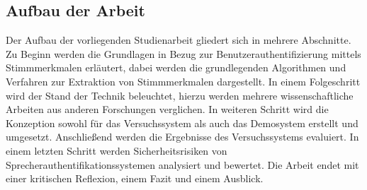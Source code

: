 \subsection{Aufbau der Arbeit}
Der Aufbau der vorliegenden Studienarbeit gliedert sich in mehrere Abschnitte.
Zu Beginn werden die Grundlagen in Bezug zur Benutzerauthentifizierung mittels Stimmmerkmalen erläutert, dabei werden die grundlegenden Algorithmen und Verfahren zur Extraktion von Stimmmerkmalen dargestellt.
In einem Folgeschritt wird der Stand der Technik beleuchtet, hierzu werden mehrere wissenschaftliche Arbeiten aus anderen Forschungen verglichen.
In weiteren Schritt wird die Konzeption sowohl für das Versuchssystem als auch das Demosystem erstellt und umgesetzt.
Anschließend werden die Ergebnisse des Versuchssystems evaluiert.
In einem letzten Schritt werden Sicherheitsrisiken von Sprecherauthentifikationssystemen analysiert und bewertet.
Die Arbeit endet mit einer kritischen Reflexion, einem Fazit und einem Ausblick.